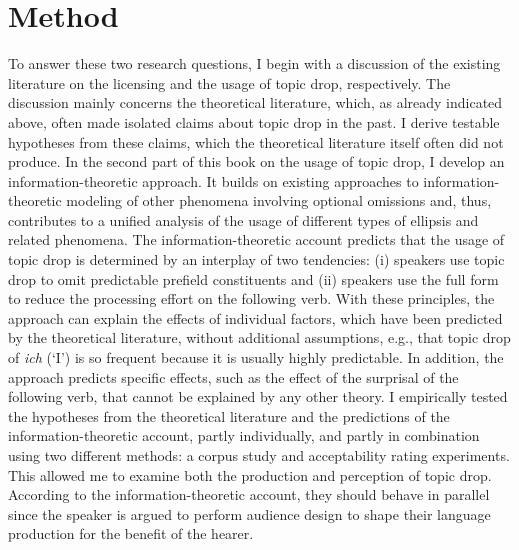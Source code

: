 \section{Method}
To answer these two research questions, I begin with a discussion of the existing literature on the licensing and the usage of topic drop, respectively.
The discussion mainly concerns the theoretical literature, which, as already indicated above, often made isolated claims about topic drop in the past.
I derive testable hypotheses from these claims, which the theoretical literature itself often did not produce.
In the second part of this book on the usage of topic drop, I develop an information\hyp theoretic approach. 
It builds on existing approaches to information\hyp theoretic modeling of other phenomena involving optional omissions and, thus, contributes to a unified analysis of the usage of different types of ellipsis and related phenomena.
The information\hyp theoretic account predicts that the usage of topic drop is determined by an interplay of two tendencies:
(i) speakers use topic drop to omit predictable  prefield constituents and (ii) speakers use the full form to reduce the processing effort on the following verb. 
With these principles, the approach can explain the effects of individual factors, which have been predicted by the theoretical literature, without additional assumptions, e.g., that topic drop of \textit{ich} (`I') is so frequent because it is usually highly predictable. 
In addition, the approach predicts specific effects, such as the effect of the surprisal of the following verb, that cannot be explained by any other theory.
I empirically tested the hypotheses from the theoretical literature and the predictions of the information\hyp theoretic  account, partly individually, and partly in combination using two different methods:
a corpus study and acceptability rating experiments.
This allowed me to examine both the production and perception of topic drop.
According to the information\hyp theoretic account, they should behave in parallel since the speaker is argued to perform audience design  \citep{bell1984} to shape their language production for the benefit of the hearer.

